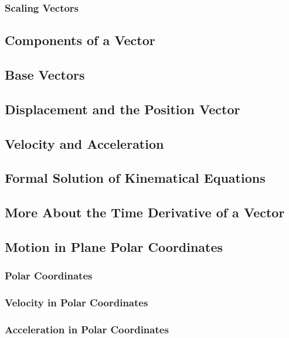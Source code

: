 \documentclass[10pt]{article}
\begin{document}
\subsubsection{Scaling Vectors}

\subsection{Components of a Vector}

\subsection{Base Vectors}

\subsection{Displacement and the Position Vector}

\subsection{Velocity and Acceleration}

\subsection{Formal Solution of Kinematical Equations}

\subsection{More About the Time Derivative of a Vector}

\subsection{Motion in Plane Polar Coordinates}
\subsubsection{Polar Coordinates}
\subsubsection{Velocity in Polar Coordinates}
\subsubsection{Acceleration in Polar Coordinates}

\newpage
\end{document}
